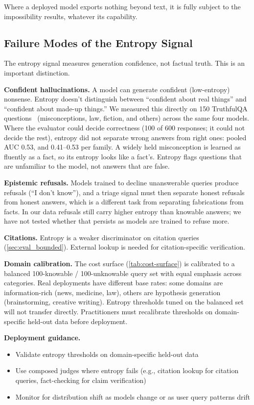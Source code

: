 \documentclass[11pt]{article}
\newcommand{\fakepara}[1]{\noindent\textbf{#1}\xspace}
\begin{document}
Where a deployed model exports nothing beyond text, it is fully subject to the impossibility results, whatever its capability.

\subsection{Failure Modes of the Entropy Signal}

The entropy signal measures generation confidence, not factual truth. This is an important distinction.

\fakepara{Confident hallucinations.} A model can generate confident (low-entropy) nonsense. Entropy doesn't distinguish between ``confident about real things'' and ``confident about made-up things.'' We measured this directly on 150 TruthfulQA questions~\citep{lin2022truthfulqa} (misconceptions, law, fiction, and others) across the same four models. Where the evaluator could decide correctness (100 of 600 responses; it could not decide the rest), entropy did not separate wrong answers from right ones: pooled AUC 0.53, and 0.41--0.53 per family. A widely held misconception is learned as fluently as a fact, so its entropy looks like a fact's. Entropy flags questions that are unfamiliar to the model, not answers that are false.

\fakepara{Epistemic refusals.} Models trained to decline unanswerable queries produce refusals (``I don't know''), and a triage signal must then separate honest refusals from honest answers, which is a different task from separating fabrications from facts. In our data refusals still carry higher entropy than knowable answers; we have not tested whether that persists as models are trained to refuse more.

\fakepara{Citations.} Entropy is a weaker discriminator on citation queries (\autoref{sec:eval_bounded}). External lookup is needed for citation-specific verification.

\fakepara{Domain calibration.} The cost surface (\autoref{tab:cost-surface}) is calibrated to a balanced 100-knowable / 100-unknowable query set with equal emphasis across categories. Real deployments have different base rates: some domains are information-rich (news, medicine, law), others are hypothesis generation (brainstorming, creative writing). Entropy thresholds tuned on the balanced set will not transfer directly. Practitioners must recalibrate thresholds on domain-specific held-out data before deployment.

\fakepara{Deployment guidance.}
\begin{itemize}
    \item Validate entropy thresholds on domain-specific held-out data
    \item Use composed judges where entropy fails (e.g., citation lookup for citation queries, fact-checking for claim verification)
    \item Monitor for distribution shift as models change or as user query patterns drift
\end{itemize}
\end{document}
